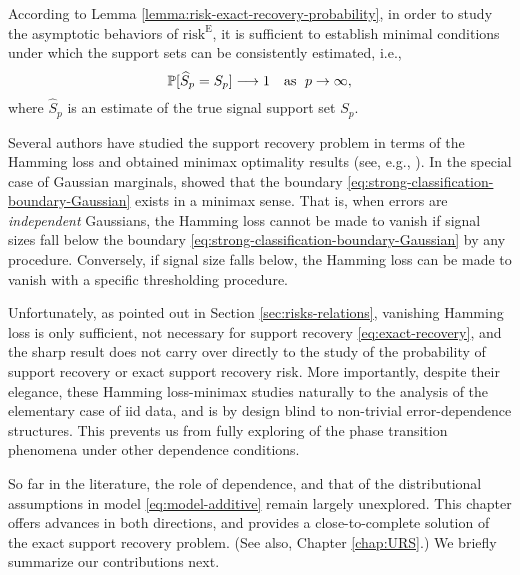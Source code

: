 According to Lemma \ref{lemma:risk-exact-recovery-probability}, in order to study the asymptotic behaviors of $\mathrm{risk}^{\mathrm{E}}$, it is sufficient to establish minimal conditions under which the support sets can be consistently estimated, i.e.,
\begin{equation} \label{eq:exact-recovery} 
    \P[\widehat{S}_p = S_p] \longrightarrow 1 \quad \text{as } \; p\to\infty, 
\end{equation}
where $\widehat{S}_p$ is an estimate of the true signal support set $S_p$.

\medskip

Several authors have studied the support recovery problem in terms of the Hamming loss and obtained minimax optimality results (see, e.g., \cite{ji2012ups, genovese2012comparison, jin2014optimality, butucea2018variable}).
In the special case of Gaussian marginals, \cite{butucea2018variable} showed that the boundary \eqref{eq:strong-classification-boundary-Gaussian} exists in a minimax sense.
That is, when errors are \emph{independent} Gaussians, the Hamming loss cannot be made to vanish if signal sizes fall below the boundary \eqref{eq:strong-classification-boundary-Gaussian} by any procedure. 
Conversely, if signal size falls below, the Hamming loss can be made to vanish with a specific thresholding procedure.

Unfortunately, as pointed out in Section \ref{sec:risks-relations}, vanishing Hamming loss is only sufficient, not necessary for support recovery \eqref{eq:exact-recovery}, and the sharp result does not carry over directly to the study of the probability of support recovery or exact support recovery risk.
More importantly, despite their elegance, these Hamming loss-minimax studies naturally  to the analysis of the elementary case of iid data, and is by design blind to non-trivial error-dependence structures.
This prevents us from fully exploring of the phase transition phenomena under other dependence conditions.

So far in the literature, the role of dependence, and that of the distributional assumptions in model \eqref{eq:model-additive} remain largely unexplored.  
This chapter offers advances in both directions, and provides a close-to-complete solution of the exact support recovery problem. (See also, Chapter \ref{chap:URS}.)
We briefly summarize our contributions next.


